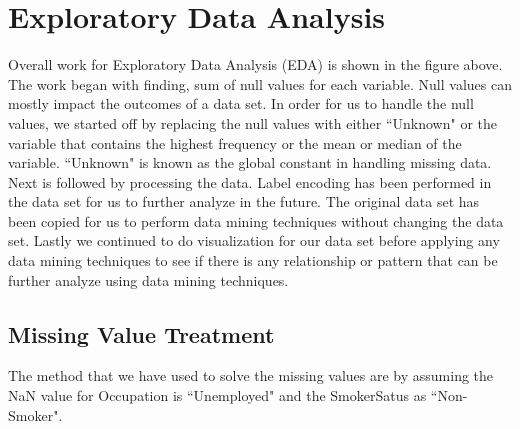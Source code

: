 \documentclass[11pt]{article}
\begin{document}
\section{Exploratory Data Analysis}

\begin{center}

\end{center}

Overall work for Exploratory Data Analysis (EDA) is shown in the figure above. The work began with finding, sum of null values for each variable. Null values can mostly impact the outcomes of a data set. In order for us to handle the null values, we started off by replacing the null values with either ``Unknown" or the variable that contains the highest frequency or the mean or median of the variable. ``Unknown" is known as the global constant in handling missing data. Next is followed by processing the data. Label encoding has been performed in the data set for us to further analyze in the future. The original data set has been copied for us to perform data mining techniques without changing the data set. Lastly we continued to do visualization for our data set before applying any data mining techniques to see if there is any relationship or pattern that can be further analyze using data mining techniques.

\subsection{Missing Value Treatment}

\hspace{0.5cm}The method that we have used to solve the missing values are by assuming the NaN value for Occupation is ``Unemployed" and the SmokerSatus as ``Non-Smoker". \vspace{0.3cm}

\hspace{0.5cm}{Additionally, we replaced the null(NaN) value by applying value\_counts function to get the highest frequency of the variable and we replaced to NaN value. For instance, we replaced the NaN value of the variable ``HomeAddress" to ``central\_mal". }\vspace{0.3cm}
\end{document}
